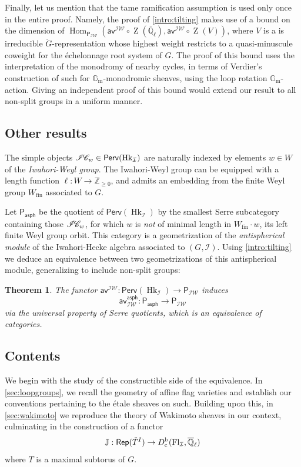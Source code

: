 \documentclass{amsart}
\newcommand{\Dbc}{D^{\mathrm{b}}_{\mathrm{c}}}
\newcommand{\Z}{\mathbb{Z}}
\newcommand{\Gm}{\mathbb{G}_{\mathrm{m}}}
\newcommand{\Wfin}{W_{\mathrm{fin}}}
\newcommand{\IC}{\mathscr{I} \hspace{-1pt} \mathscr{C}}
\newcommand{\Perv}{\mathsf{Perv}}
\newcommand{\Rep}{\mathsf{Rep}}
\DeclareMathOperator{\Hom}{Hom}
\newcommand{\Hk}[1]{\ensuremath{\operatorname{Hk}_{#1}}}
\newcommand{\Zent}{\operatorname{Z}}
\newcommand{\Qell}{\ensuremath{\overline{\mathbb{Q}}_\ell}}
\newcommand{\I}{\mathcal{I}}
\newcommand{\PIW}{\mathsf{P}_{\mathcal{IW}}}
\newcommand{\Pasph}{\mathsf{P}_{\mathsf{asph}}}
\newcommand{\aviw}{\mathsf{av}^\mathcal{IW}}
\newcommand{\avasph}{\mathsf{av}^\mathsf{asph}_\mathcal{IW}}
\newcommand{\Fl}[2][]{%
  \ifblank{#1}{
    \operatorname{Fl}_{#2}}
  {
    \operatorname{Fl}_{#1,#2}}}
\numberwithin{equation}{section}
\newtheorem{thrm}{Theorem}[section]
\theoremstyle{definition}
\theoremstyle{remark}
\begin{document}
Finally, let us mention that the tame ramification assumption is used only once in the entire
proof.
Namely, the proof of \cref{intro:tilting} makes use of a bound on the
dimension of $\Hom_{\PIW}(\aviw\circ\Zent(\Qell),\aviw\circ\Zent(V))$, where $V$ is a is
irreducible $\check G$-representation whose highest weight restricts to a quasi-minuscule
coweight for the \'echelonnage root system of $G$. The proof of this bound uses the interpretation of
the monodromy of nearby cycles, in terms of Verdier's construction of such for $\Gm$-monodromic
sheaves, using the loop rotation $\Gm$-action. Giving an independent proof of this bound would
extend our result to all non-split groups in a uniform manner.
\subsection{Other results}
The simple objects $\IC_w\in\Perv(\Hk{\I})$ are naturally indexed by elements $w\in
W$ of the \textit{Iwahori-Weyl
group}. The Iwahori-Weyl group  can be equipped with a length function
$\ell:W\rightarrow\Z_{\geq 0}$, and
admits an embedding from the finite Weyl group $\Wfin$ associated to $G$.

Let $\Pasph$ be the quotient of $\Perv(\Hk{\I})$ by the smallest Serre
subcategory containing those $\IC_w$, for which $w$ is \textit{not} of minimal length in
$\Wfin\cdot w$, its left finite Weyl group orbit. This category is a geometrization of the \textit{antispherical module}
of the Iwahori-Hecke algebra associated to $(G,\I)$.
Using \cref{intro:tilting} we deduce an equivalence between two geometrizations of this
antispherical module,
generalizing \cite[Theorem 2]{arkhipovBezrukavnikov} to include non-split groups:
\begin{thrm}\label{intro:key}
The functor $\aviw:\Perv(\Hk{\I})\rightarrow \PIW$
	induces
	$$\avasph:\Pasph \rightarrow\PIW$$
	via the universal property of Serre quotients, which is an equivalence of categories.
\end{thrm}
\subsection{Contents}
We begin with the study of the constructible side of the equivalence.
In \cref{sec:loopgroups}, we recall the geometry of affine flag varieties and establish our
conventions pertaining to the \'etale sheaves on such. Building upon this, in \cref{sec:wakimoto} we reproduce the
theory of Wakimoto sheaves in our context, culminating in the
construction of a functor
$$\mathbb{J}:\Rep(\check T^I)\rightarrow \Dbc(\Fl{\I},\Qell)$$
where $T$ is a maximal subtorus of $G$.
\end{document}
